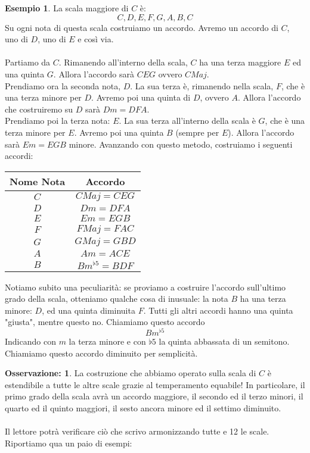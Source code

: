 \documentclass[12pt,a4paper]{report}
\theoremstyle{definition}
\theoremstyle{Theorem}
\theoremstyle{definition}
\newtheorem{Ex}[Def]{Esempio}
\theoremstyle{definition}
\theoremstyle{definition}
\newtheorem{Obs}[Def]{Osservazione:}
\begin{document}
	 		\begin{Ex}
	 			La scala maggiore di $C$ è:
	 			$$C,D,E,F,G,A,B,C$$
	 			Su ogni nota di questa scala costruiamo un accordo. Avremo un accordo di $C$, uno di $D$, uno di $E$ e così via.\\
	 			\\
	 			Partiamo da $C$. Rimanendo all'interno della scala, $C$ ha una terza maggiore $E$ ed una quinta $G$. Allora l'accordo sarà $CEG$ ovvero $CMaj$.\\
	 			Prendiamo ora la seconda nota, $D$. La sua terza è, rimanendo nella scala, $F$, che è una terza minore per $D$. Avremo poi una quinta di $D$, ovvero $A$. Allora l'accordo che costruiremo su $D$ sarà $Dm=DFA$.\\
	 			Prendiamo poi la terza nota: $E$. La sua terza all'interno della scala è $G$, che è una terza minore per $E$. Avremo poi una quinta $B$ (sempre per $E$). Allora l'accordo sarà $Em=EGB$ minore. Avanzando con questo metodo, costruiamo i seguenti accordi:
	 			\begin{center}
	 				\begin{tabular}{||c|c||}
	 					\hline
	 					Nome Nota & Accordo\\
	 					\hline
	 					$C$ & $CMaj=CEG$\\
	 					\hline
	 					$D$ & $Dm=DFA$\\
	 					\hline
	 					$E$ & $Em=EGB$\\
	 					\hline
	 					$F$ & $FMaj=FAC$\\
	 					\hline
	 					$G$ & $GMaj=GBD$\\
	 					\hline
	 					$A$ & $Am=ACE$\\
	 					\hline
	 					$B$ & $Bm^{\flat5}=BDF$\\
	 					\hline
	 				\end{tabular}
	 			\end{center}
	 			Notiamo subito una peculiarità: se proviamo a costruire l'accordo sull'ultimo grado della scala, otteniamo qualche cosa di inusuale: la nota $B$ ha una terza minore: $D$, ed una quinta diminuita $F$. Tutti gli altri accordi hanno una quinta "giusta", mentre questo no. Chiamiamo questo accordo $$Bm^{\flat5}$$
	 			Indicando con $m$ la terza minore e con $\flat5$ la quinta abbassata di un semitono. Chiamiamo questo accordo diminuito per semplicità.
	 		\end{Ex}
	 		\begin{Obs}
	 			La costruzione che abbiamo operato sulla scala di $C$ è estendibile a tutte le altre scale grazie al temperamento equabile! In particolare, il primo grado della scala avrà un accordo maggiore, il secondo ed il terzo minori, il quarto ed il quinto maggiori, il sesto ancora minore ed il settimo diminuito.\\
	 			\\
	 			Il lettore potrà verificare ciò che scrivo armonizzando tutte e 12 le scale. Riportiamo qua un paio di esempi:
	 		\end{Obs}
\end{document}
